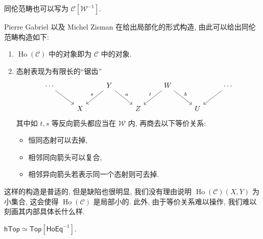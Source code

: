 \begin{remark}
    同伦范畴也可以写为 $\mathcal{C}[\mathcal{W}^{-1}]$.
\end{remark}
Pierre Gabriel 以及 Michel Zisman 在\cite[1.1]{Gabriel-Zisman67}给出局部化的形式构造, 由此可以给出同伦范畴构造如下:
\begin{enumerate}
    \item $\operatorname{Ho}(\mathcal{C})$ 中的对象即为 $\mathcal{C}$ 中的对象.
    \item 态射表现为有限长的``锯齿''
    \[\begin{tikzcd}
	\cdots && Y && W && \cdots \\
	& X && Z && U
	\arrow[from=1-1, to=2-2]
	\arrow["s"', from=1-3, to=2-2]
	\arrow["a", from=1-3, to=2-4]
	\arrow["t"', from=1-5, to=2-4]
	\arrow["b", from=1-5, to=2-6]
	\arrow[from=1-7, to=2-6]
    \end{tikzcd}\]
    其中如 $t,s$ 等反向箭头都应当在 $\mathcal{W}$ 内, 再商去以下等价关系:
    \begin{itemize}
        \item 恒同态射可以去掉,
        \item 相邻同向箭头可以复合,
        \item 相邻异向箭头若表示同一个态射则可去掉.
    \end{itemize}
\end{enumerate}
这样的构造是普适的, 但是缺陷也很明显, 我们没有理由说明 $\operatorname{Ho}(\mathcal{C})(X,Y)$ 为小集合,
这会使得 $\operatorname{Ho}(\mathcal{C})$ 是局部小的. 此外, 由于等价关系难以操作, 我们难以刻画其内部具体长什么样.
\begin{proposition} \label{thm-1-htop}
    $\mathsf{hTop}\simeq\mathsf{Top}[\mathsf{HoEq}^{-1}]$.
\end{proposition}

